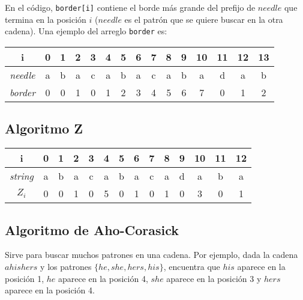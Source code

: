 \documentclass[10pt,letterpaper,twocolumn]{article}
\newcommand{\codigofuente}[1]{

\dotfill
}
\begin{document}
\smallskip

En el código, \verb_border[i]_ contiene el borde más grande del prefijo de $needle$ que termina en la posición $i$ ($needle$
es el patrón que se quiere buscar en la otra cadena). Una ejemplo del arreglo \verb_border_ es: \\


\begin{center}
  \begin{tabular}{| c | c c c c c c c c c c c c c c | }
    \hline
    i & 0 & 1 & 2 & 3 & 4 & 5 & 6 & 7 & 8 & 9 & 10 & 11 & 12 & 13 \\ [0.5ex]
    \hline
    \hline
    \textit{needle} & a & b & a & c & a & b & a & c & a & b & a & d & a & b \\
    \textit{border} & 0 & 0 & 1 & 0 & 1 & 2 & 3 & 4 & 5 & 6 & 7 & 0 & 1 & 2 \\
    \hline
  \end{tabular}
\end{center}



\codigofuente{./src/strings/kmp.cpp}

\subsection{Algoritmo Z}

\begin{center}
  \begin{tabular}{| c | c c c c c c c c c c c c c | }
    \hline
    i & 0 & 1 & 2 & 3 & 4 & 5 & 6 & 7 & 8 & 9 & 10 & 11 & 12 \\ [0.5ex]
    \hline
    \hline
    \textit{string} & a & b & a & c & a & b & a & c & a & d & a & b & a \\
    \textit{$Z_i$} & 0 & 0 & 1 & 0 & 5 & 0 & 1 & 0 & 1 & 0 & 3 & 0 & 1 \\
    \hline
  \end{tabular}
\end{center}


\codigofuente{./src/strings/z_algorithm.cpp}

\subsection{Algoritmo de Aho-Corasick}
Sirve para buscar muchos patrones en una cadena. Por ejemplo,
dada la cadena $ahishers$ y los patrones $\{he, she, hers, his\}$,
encuentra que $his$ aparece en la posición 1, $he$ aparece en la posición 4,
$she$ aparece en la posición 3 y $hers$ aparece en la posición 4. \\
\end{document}
